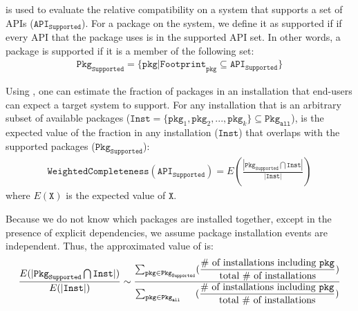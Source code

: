 
\Compatmetric{} is used to evaluate the relative compatibility on a system that
supports a set of APIs ($\mathtt{API}_\mathtt{Supported}$).
For a package on the system, we define it as supported if 
if every API that the package uses is in the supported API set.
In other words, a package is supported if it is a member of the following set:
\begin{align*}
\mathtt{Pkg}_\mathtt{Supported} = \{\mathtt{pkg} | \mathtt{Footprint}_\mathtt{pkg} \subseteq \mathtt{API}_\mathtt{Supported}\}
\end{align*}

\noindent
Using \compatmetric{}, one can estimate the fraction of packages in an installation that end-users can expect a target system to support.
For any installation
that is an arbitrary subset of available packages
($\mathtt{Inst} = \{\mathtt{pkg}_1, \mathtt{pkg}_2, ..., \mathtt{pkg}_k\} \subseteq \mathtt{Pkg}_\mathtt{all}$),
\compatmetric{} is the expected value of
the fraction in any installation ($\mathtt{Inst}$)
that overlaps with the supported packages ($\mathtt{Pkg}_\mathtt{Supported}$):
\begin{align*}
\mathtt{Weighted Completeness}(\mathtt{API}_\mathtt{Supported}) =
E(\frac{|\mathtt{Pkg}_\mathtt{Supported} \bigcap \mathtt{Inst}|}{|\mathtt{Inst}|}) 
\end{align*}
where $E(\mathtt{X})$ is the expected value of $\mathtt{X}$.

Because we do not know which packages are installed together,
except in the presence of explicit dependencies,
we assume package installation events are independent.
Thus, the approximated value of \compatmetric{} is:
\begin{align*}
\frac{E(|\mathtt{Pkg}_\mathtt{Supported} \bigcap \mathtt{Inst}|)}{E(|\mathtt{Inst}|)}
\sim \dfrac{\sum_{\mathtt{pkg} \in \mathtt{Pkg}_\mathtt{Supported}} (\dfrac{\text{\# of installations including $\mathtt{pkg}$}}{\text{total \# of installations}})}{\sum_{\mathtt{pkg} \in \mathtt{Pkg}_\mathtt{all\hspace{0.21in}}} (\dfrac{\text{\# of installations including $\mathtt{pkg}$}}{\text{total \# of installations}})}
\end{align*}
